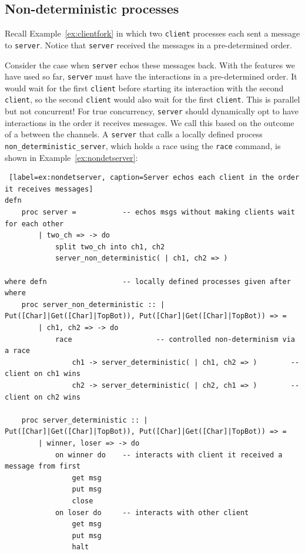 \documentclass[11pt]{article}
\begin{document}
\subsection{Non-deterministic processes}
\label{Sec:races}

Recall Example~\ref{ex:clientfork} in which two \lstinline$client$ processes each sent a message to \lstinline$server$. 
Notice that \lstinline$server$ received the messages in a pre-determined order.

Consider the case when \lstinline$server$ echos these messages back.
With the features we have used so far, \lstinline$server$ must have the interactions in a pre-determined order.
It would wait for the first \lstinline$client$ before starting its interaction with the second \lstinline$client$, so the second \lstinline$client$ would also wait for the first \lstinline$client$. This is parallel but not concurrent!
For true concurrency, \lstinline$server$ should dynamically opt to have interactions in the order it receives messages. 
We call this  based on the outcome of a  between the channels.
A \lstinline$server$ that calls a locally defined process \lstinline$non_deterministic_server$, which holds a race
using the \lstinline$race$ command, is shown in Example~\ref{ex:nondetserver}:
\begin{lstlisting} [label=ex:nondetserver, caption=Server echos each client in the order it receives messages]
defn
	proc server =			-- echos msgs without making clients wait for each other
		| two_ch => -> do
			split two_ch into ch1, ch2
			server_non_deterministic( | ch1, ch2 => )

where defn					-- locally defined processes given after where
	proc server_non_deterministic :: | 																				Put([Char]|Get([Char]|TopBot)), Put([Char]|Get([Char]|TopBot)) => =
		| ch1, ch2 => -> do
			race					-- controlled non-determinism via a race
				ch1 -> server_deterministic( | ch1, ch2 => )		-- client on ch1 wins
				ch2 -> server_deterministic( | ch2, ch1 => )		-- client on ch2 wins
	
	proc server_deterministic :: | 																						Put([Char]|Get([Char]|TopBot)), Put([Char]|Get([Char]|TopBot)) => =
		| winner, loser => -> do
			on winner do	-- interacts with client it received a message from first
				get msg
				put msg
				close
			on loser do		-- interacts with other client
				get msg
				put msg
				halt
\end{lstlisting}
\end{document}
